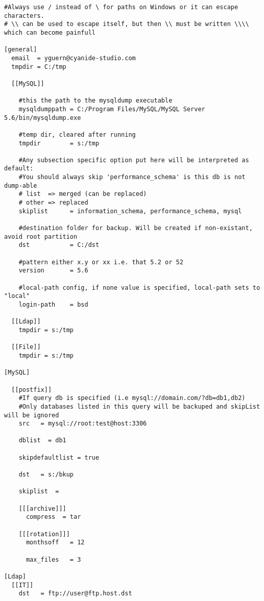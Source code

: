 \begin{verbatim}
#Always use / instead of \ for paths on Windows or it can escape characters.
# \\ can be used to escape itself, but then \\ must be written \\\\ which can become painfull

[general]
  email  = yguern@cyanide-studio.com
  tmpdir = C:/tmp

  [[MySQL]]
  
    #this the path to the mysqldump executable
    mysqldumppath = C:/Program Files/MySQL/MySQL Server 5.6/bin/mysqldump.exe
  
    #temp dir, cleared after running
    tmpdir        = s:/tmp
  
    #Any subsection specific option put here will be interpreted as default:
    #You should always skip 'performance_schema' is this db is not dump-able
    # list  => merged (can be replaced)
    # other => replaced
    skiplist      = information_schema, performance_schema, mysql
  
    #destination folder for backup. Will be created if non-existant, avoid root partition
    dst           = C:/dst
  
    #pattern either x.y or xx i.e. that 5.2 or 52
    version       = 5.6
  
    #local-path config, if none value is specified, local-path sets to "local"
    login-path    = bsd
  
  [[Ldap]]
    tmpdir = s:/tmp

  [[File]]
    tmpdir = s:/tmp

[MySQL]

  [[postfix]]
    #If query db is specified (i.e mysql://domain.com/?db=db1,db2)
    #Only databases listed in this query will be backuped and skipList will be ignored
    src   = mysql://root:test@host:3306

    dblist  = db1

    skipdefaultlist = true

    dst   = s:/bkup

    skiplist  = 

    [[[archive]]]
      compress  = tar

    [[[rotation]]]
      monthsoff   = 12

      max_files   = 3

[Ldap]
  [[IT]]
    dst   = ftp://user@ftp.host.dst


\end{verbatim}
